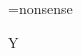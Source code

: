 %
%

\setbox\cals@backup@row=\hbox{nonsense}

\begin{calstable}
\colwidths{{90pt}}
\brow
{}
\erow
\brow
{}
\erow
\end{calstable}

\show Y
